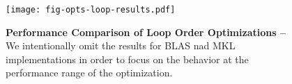 
\begin{figure}

  \centering
  \texttt{[image: fig-opts-loop-results.pdf]}

  \caption{\textbf{Performance Comparison of Loop Order Optimizations --}
    We intentionally omit the results for BLAS nad MKL implementations in
    order to focus on the behavior at the performance range of the
    optimization.}

  \label{fig-opts-loop-results}

\end{figure}
